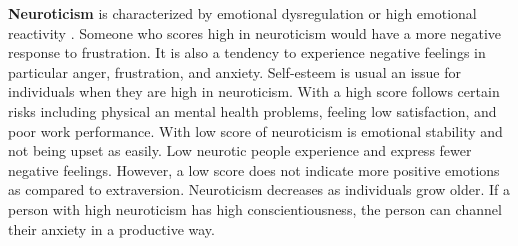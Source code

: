 \textbf{Neuroticism} is characterized by emotional dysregulation or high emotional reactivity \cite{big-five-john1999big}. Someone who scores high in neuroticism would have a more negative response to frustration. It is also a tendency to experience negative feelings in particular anger, frustration, and anxiety. Self-esteem is usual an issue for individuals when they are high in neuroticism. With a high score follows certain risks including physical an mental health problems, feeling low satisfaction, and poor work performance. With low score of neuroticism is emotional stability and not being upset as easily. Low neurotic people experience and express fewer negative feelings. However, a low score does not indicate more positive emotions as compared to extraversion. Neuroticism decreases as individuals grow older. If a person with high neuroticism has high conscientiousness, the person can channel their anxiety in a productive way. 






